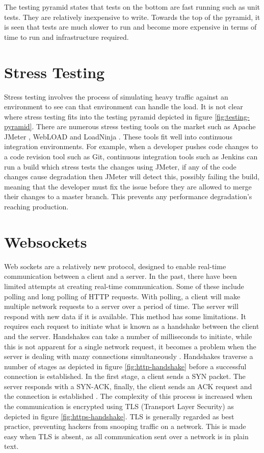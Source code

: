The testing pyramid states that tests on the bottom are fast running such as unit tests. They are relatively inexpensive to write. Towards the top of the pyramid, it is seen that tests are much slower to run and become more expensive in terms of time to run and infrastructure required.

\section{Stress Testing}

Stress testing involves the process of simulating heavy traffic against an environment to see can that environment can handle the load. It is not clear where stress testing fits into the testing pyramid depicted in figure \ref{fig:testing-pyramid}. There are numerous stress testing tools on the market such as Apache JMeter \cite{jmeter}, WebLOAD \cite{webload} and LoadNinja \cite{loadninja}. These tools fit well into continuous integration environments. For example, when a developer pushes code changes to a code revision tool such as Git, continuous integration tools such as Jenkins \cite{jenkinsCi} can run a build which stress tests the changes using JMeter, if any of the code changes cause degradation then JMeter will detect this, possibly failing the build, meaning that the developer must fix the issue before they are allowed to merge their changes to a master branch. This prevents any performance degradation's reaching production.

\section{Websockets}

Web sockets are a relatively new protocol, designed to enable real-time communication between a client and a server. In the past, there have been limited attempts at creating real-time communication. Some of these include polling and long polling of HTTP requests. With polling, a client will make multiple network requests to a server over a period of time. The server will respond with new data if it is available. This method has some limitations. It requires each request to initiate what is known as a handshake between the client and the server. Handshakes can take a number of milliseconds to initiate, while this is not apparent for a single network request, it becomes a problem when the server is dealing with many connections simultaneously \cite{5735801}. Handshakes traverse a number of stages as depicted in figure \ref{fig:http-handshake} before a successful connection is established. In the first stage, a client sends a SYN packet. The server responds with a SYN-ACK, finally, the client sends an ACK request and the connection is established \cite{5735801}. The complexity of this process is increased when the communication is encrypted using TLS (Transport Layer Security) as depicted in figure \ref{fig:https-handshake}. TLS is generally regarded as best practice, preventing hackers from snooping traffic on a network. This is made easy when TLS is absent, as all communication sent over a network is in plain text.

